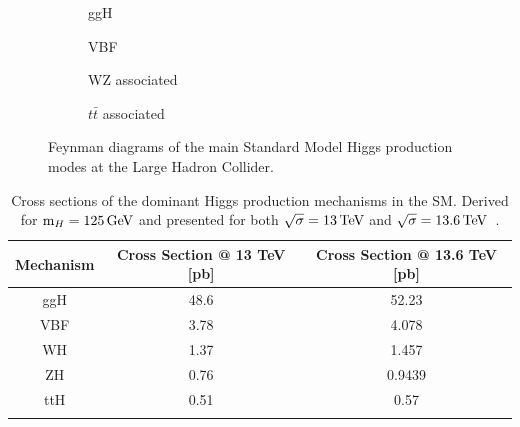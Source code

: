 \begin{figure}[h]
    \centering
    \begin{subfigure}{0.45\textwidth}
        \centering
        
        \caption{ggH}
    \end{subfigure}
    \hfill
    \begin{subfigure}{0.45\textwidth}
        \centering
        
        \caption{VBF}
    \end{subfigure}

    \vspace{0.5cm}

    \begin{subfigure}{0.45\textwidth}
        \centering
        \raisebox{-5mm}{}
        \caption{WZ associated}
    \end{subfigure}
    \hfill
    \begin{subfigure}{0.45\textwidth}
        \centering
        
        \caption{$t\bar{t}$ associated}
    \end{subfigure}

    \caption{Feynman diagrams of the main Standard Model Higgs production modes at the Large Hadron Collider.}
    \label{Figure:Introduction_HiggsProductionModes}
\end{figure}


\begin{table}[htbp]
\centering
\renewcommand{\arraystretch}{1.5} %
\begin{tabular}{|c|c|c|}
\hline
Mechanism & Cross Section @ 13 TeV [pb] & Cross Section @ 13.6 TeV [pb] \\ \hline \hline 
ggH                                & 48.6  & 52.23 \\ 
\arrayrulecolor{lightgray} \hline
VBF                                & 3.78  & 4.078 \\ 
\arrayrulecolor{lightgray} \hline
WH                                 & 1.37  & 1.457 \\ 
\arrayrulecolor{lightgray} \hline
ZH                                 & 0.76  & 0.9439 \\ 
\arrayrulecolor{lightgray} \hline
ttH                                & 0.51  & 0.57 \\ 
\arrayrulecolor{black} \hline
\end{tabular}
\caption[Cross sections of dominant Standard Model Higgs production modes at $13$ and $13.6\TeV$]{Cross sections of the dominant Higgs production mechanisms in the \ac{SM}. Derived for $\text{m}_H = 125\,\text{Ge\hspace{-.08em}V}$ and presented for both $\sqrt{\sigma}=13\,\text{Te\hspace{-.08em}V}$ and $\sqrt{\sigma}=13.6\,\text{Te\hspace{-.08em}V}$~\cite{HiggsProduction_XS_13TeV,HiggsProduction_XS_13p6TeV}.}
\label{Table:Introduction_HiggsProduction_XS}
\end{table}

